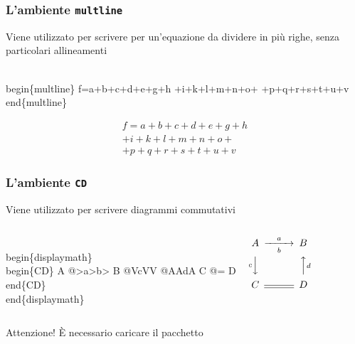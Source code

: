 \documentclass[svgnames,%
	ucs,%
	pdftex]{guitbeamer}
\begin{document}
\begin{frame}
  \frametitle{L'ambiente \texttt{multline}}
	Viene utilizzato per scrivere per un'equazione da dividere in pi\`u righe, senza particolari allineamenti
	\begin{LaTeXcode}
		\alert{\\begin\{multline\}}\n
		\hspace*{5ex} f=a+b+c+d+e+g+h \bs\bs\n
		\hspace*{5ex} +i+k+l+m+n+o+\bs\bs\n
		\hspace*{5ex} +p+q+r+s+t+u+v \n
		\alert{\\end\{multline\}} 
	\end{LaTeXcode}
	\begin{LaTeXoutput}
		\begin{multline} 
		f=a+b+c+d+e+g+h \\ 
		+i+k+l+m+n+o+\\ 
		+p+q+r+s+t+u+v 
		\end{multline} 
	\end{LaTeXoutput}
\end{frame}
\begin{frame}
  \frametitle{L'ambiente \texttt{CD}}
	Viene utilizzato per scrivere diagrammi commutativi
  \begin{columns}
	\begin{LaTeXcode}
		\\begin\{displaymath\}\n
		\alert{\\begin\{CD\}}\n
		\hspace*{5ex} A	@>a>b> B \bs\bs\n
		\hspace*{5ex} @VcVV	@AAdA\bs\bs\n
		\hspace*{5ex} C 	@= D\n
		\alert{\\end\{CD\}}\n
		\\end\{displaymath\} 
	\end{LaTeXcode}
	\begin{LaTeXoutput}
		\vspace{3ex}
		\begin{displaymath} 
		\begin{CD}
		A	@>a>b> B \\
		@VcVV	@AAdA\\
		C	@= D\\
		\end{CD}
		\end{displaymath} 
		\vspace{3ex}
	\end{LaTeXoutput}
  \end{columns}
	\begin{block}{Attenzione!}
	\`E necessario caricare il pacchetto 
	\end{block}
\end{frame}
\end{document}
